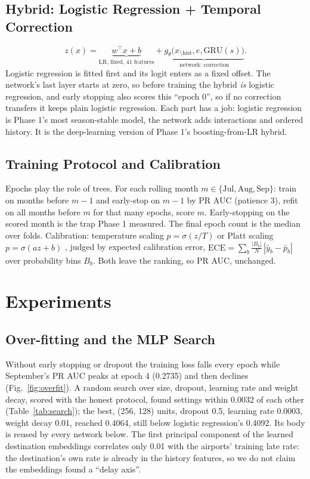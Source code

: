 \documentclass[conference]{IEEEtran}
\begin{document}
\subsection{Hybrid: Logistic Regression + Temporal Correction}
\begin{equation}
z(x) = \underbrace{w^\top x + b}_{\text{LR, fixed, 41 features}} + \underbrace{g_\theta\big(x_{\setminus\text{hist}}, e, \mathrm{GRU}(s)\big)}_{\text{network: correction}} .
\end{equation}
Logistic regression is fitted first and its logit enters as a fixed offset. The network's last layer starts at zero, so before training the hybrid \emph{is} logistic regression, and early stopping also scores this ``epoch 0'', so if no correction transfers it keeps plain logistic regression. Each part has a job: logistic regression is Phase 1's most season-stable model, the network adds interactions and ordered history. It is the deep-learning version of Phase 1's boosting-from-LR hybrid.

\subsection{Training Protocol and Calibration}
Epochs play the role of trees. For each rolling month $m \in \{\text{Jul}, \text{Aug}, \text{Sep}\}$: train on months before $m-1$ and early-stop on $m-1$ by PR AUC (patience 3), refit on all months before $m$ for that many epochs, score $m$. Early-stopping on the scored month is the trap Phase 1 measured. The final epoch count is the median over folds. Calibration: temperature scaling $p = \sigma(z/T)$ \cite{guo2017} or Platt scaling $p=\sigma(az+b)$ \cite{platt1999}, judged by expected calibration error, $\mathrm{ECE} = \sum_b \frac{|B_b|}{N}\,|\bar y_b - \bar p_b|$ over probability bins $B_b$. Both leave the ranking, so PR AUC, unchanged.

\section{Experiments}
\subsection{Over-fitting and the MLP Search}
Without early stopping or dropout the training loss falls every epoch while September's PR AUC peaks at epoch 4 (0.2735) and then declines (Fig.~\ref{fig:overfit}). A random search over size, dropout, learning rate and weight decay, scored with the honest protocol, found settings within 0.0032 of each other (Table~\ref{tab:search}); the best, (256, 128) units, dropout 0.5, learning rate 0.0003, weight decay 0.01, reached 0.4064, still below logistic regression's 0.4092. Its body is reused by every network below. The first principal component of the learned destination embeddings correlates only 0.01 with the airports' training late rate: the destination's own rate is already in the history features, so we do not claim the embeddings found a ``delay axis''.
\end{document}

